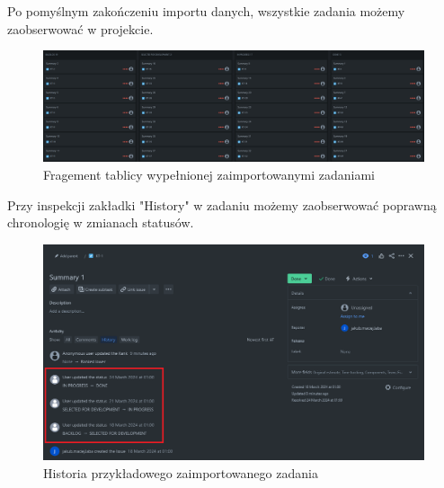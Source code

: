 Po pomyślnym zakończeniu importu danych, wszystkie zadania możemy zaobserwować w projekcie.
\begin{figure}[H]
    \centering
    \includegraphics[width=12cm,keepaspectratio]{rysunki/jira-board.png}
    \caption{Fragement tablicy wypełnionej zaimportowanymi zadaniami}
\end{figure}

Przy inspekcji zakładki "History" w zadaniu możemy zaobserwować poprawną chronologię w zmianach statusów.
\begin{figure}[H]
    \centering
    \includegraphics[width=12cm,keepaspectratio]{rysunki/jira-issue-history.png}
    \caption{Historia przykładowego zaimportowanego zadania}
\end{figure}
